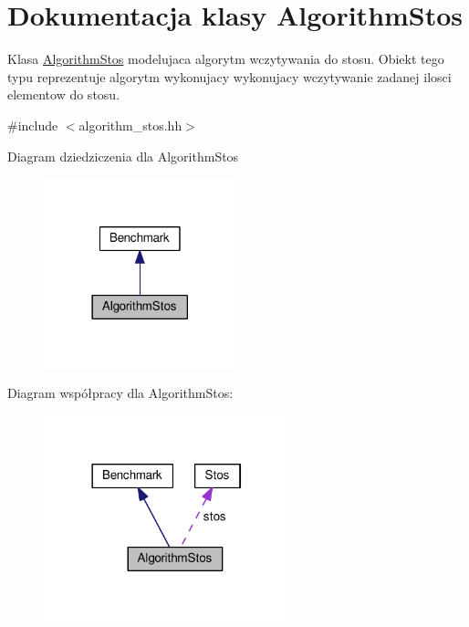 \hypertarget{class_algorithm_stos}{\section{Dokumentacja klasy Algorithm\-Stos}
\label{class_algorithm_stos}
}


Klasa \hyperlink{class_algorithm_stos}{Algorithm\-Stos} modelujaca algorytm wczytywania do stosu. Obiekt tego typu reprezentuje algorytm wykonujacy wykonujacy wczytywanie zadanej ilosci elementow do stosu.  




{\ttfamily \#include $<$algorithm\-\_\-stos.\-hh$>$}



Diagram dziedziczenia dla Algorithm\-Stos\nopagebreak
\begin{figure}[H]
\begin{center}
\leavevmode
\includegraphics[width=158pt]{class_algorithm_stos__inherit__graph}
\end{center}
\end{figure}


Diagram współpracy dla Algorithm\-Stos\-:\nopagebreak
\begin{figure}[H]
\begin{center}
\leavevmode
\includegraphics[width=201pt]{class_algorithm_stos__coll__graph}
\end{center}
\end{figure}

